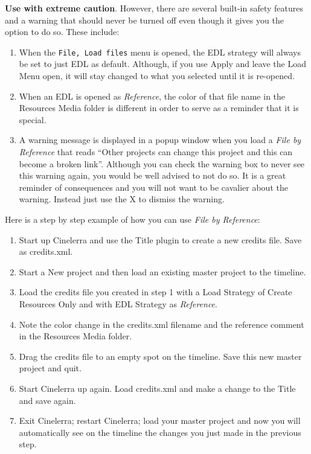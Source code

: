\textbf{Use with extreme caution}.  However, there are several built-in safety features 
and a warning that should never be turned off even though it gives you the option to do so.
These include:

\begin{enumerate}
    \item When the \texttt{File, Load files}
menu is opened, the EDL strategy will always be set to just EDL as default.  Although, if you use Apply and leave the Load Menu open, it will stay changed to what you selected until it is re-opened.
    \item  When an EDL is opened as \textit{Reference}, the color of that file name in the Resources Media folder is different in order to serve as a reminder that it is special.
    \item A warning message is displayed in a popup window when you load a \textit{File by Reference}
 that reads “Other projects can change this project and this can become a broken link”.  
Although you can check the warning box to never see this warning again, you would be well advised to not do so.  It is a great reminder of consequences and you will not want to be 
cavalier about the warning.  Instead just use the X to dismiss the warning.
\end{enumerate}

Here is a step by step example of how you can use \textit{File by Reference}:
\begin{enumerate}
    \item Start up Cinelerra and use the Title plugin to create a new credits file.  Save as credits.xml.
    \item Start a New project and then load an existing master project to the timeline.
    \item  Load the credits file you created in step 1 with a Load Strategy of Create Resources Only and with
     EDL Strategy as \textit{Reference}.
    \item  Note the color change in the credits.xml filename and the reference comment in the Resources
     Media folder.
    \item Drag the credits file to an empty spot on the timeline.  Save this new master project and quit.
    \item Start Cinelerra up again.  Load credits.xml and make a change to the Title and save again.
    \item Exit Cinelerra; restart Cinelerra; load your master project and now you will automatically see on the
     timeline the changes you just made in the previous step.
\end{enumerate}

